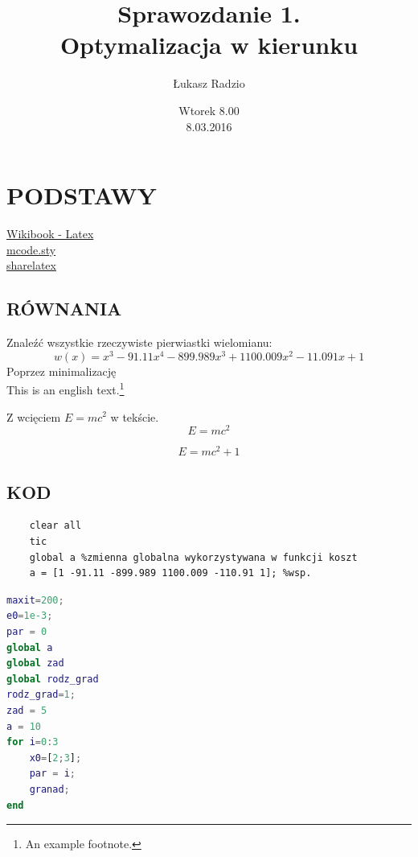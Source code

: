 \documentclass[11pt,a4paper]{article}
\author{Łukasz Radzio}
\title{Sprawozdanie 1.\\ Optymalizacja w kierunku }
\date{Wtorek 8.00\\8.03.2016}
\begin{document}
\maketitle
\section*{PODSTAWY}
\href{https://en.wikibooks.org/wiki/LaTeX/Hyperlinks}{Wikibook - Latex}\\
\href{http://www.mathworks.com/matlabcentral/fileexchange/8015-m-code-latex-package}{mcode.sty}\\
\href{https://www.sharelatex.com/learn/Positioning_images_and_tables}{sharelatex}\\
\subsection*{RÓWNANIA}%
Znaleźć wszystkie rzeczywiste pierwiastki wielomianu:
\[w(x)=x^3-91.11x^4-899.989x^3+1100.009x^2-11.091x+1\]
Poprzez minimalizację
\newline %
\\ %
This is an english text.\footnote{An example footnote.}

Z wcięciem $ E=mc^2 $ w tekście.
$$ E = mc^2 $$ %

\begin{equation} %
	E=mc^2 + 1
\end{equation}

\subsection*{KOD}

	\begin{verbatim} 
	clear all
	tic
	global a %zmienna globalna wykorzystywana w funkcji koszt
	a = [1 -91.11 -899.989 1100.009 -110.91 1]; %wsp.
	\end{verbatim}
	
	 \begin{lstlisting}[language=matlab]
% testy
maxit=200;
e0=1e-3;
par = 0
global a
global zad
global rodz_grad
rodz_grad=1;
zad = 5
a = 10
for i=0:3
    x0=[2;3];
    par = i;
    granad; 
end		     
	 \end{lstlisting}
	
\end{document}
